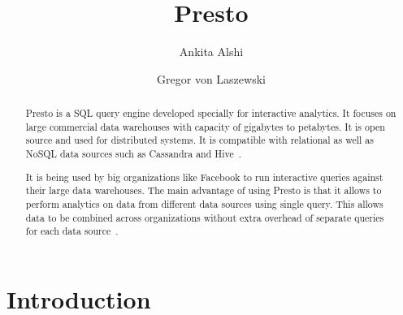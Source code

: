 
\title{Presto}


\author{Ankita Alshi}

\author{Gregor von Laszewski}




\begin{abstract}
Presto is a SQL query engine developed specially for interactive analytics. It
focuses on large commercial data warehouses with capacity of gigabytes to
petabytes. It is open source and used for distributed systems. It is compatible
with relational as well as NoSQL data sources such as Cassandra and
Hive~\cite{hid-sp18-502-prestodb-intro}.

It is being used by big organizations like Facebook to run interactive queries
against their large data warehouses. The main advantage of using Presto is that
it allows to perform analytics on data from different data sources using single
query. This allows data to be combined across organizations without extra
overhead of separate queries for each data
source~\cite{hid-sp18-502-prestodb-intro}.
\end{abstract}



\maketitle


\section{Introduction}

